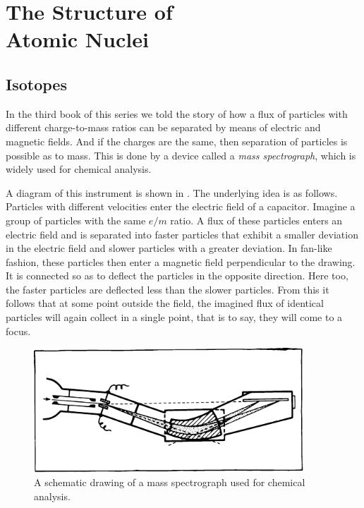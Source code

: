 

\cleardoublepage
\chapter[The Structure of Atomic Nuclei]{The Structure of \\Atomic Nuclei}
\label{ch-05}

\section{Isotopes}
In the third book of this series we told the story of how a flux of particles with different charge-to-mass ratios can be separated by means of electric and magnetic fields. And if the charges are the same, then separation of particles is possible as to mass. This is done by a device called a \emph{mass spectrograph}, which is widely used for chemical analysis.


A diagram of this instrument is shown in . The underlying idea is as follows. Particles with different velocities enter the electric field of a capacitor. Imagine a group of particles with the same $e/m$ ratio. A flux of these particles enters an electric field and is separated into faster particles that exhibit a smaller deviation in the electric field and slower particles with a greater
deviation. In fan-like fashion, these particles then enter a magnetic field perpendicular to the drawing. It is con­nected so as to deflect the particles in the opposite di­rection. Here too, the faster particles are deflected less than the slower particles. From this it follows that at some point outside the field, the imagined flux of identical particles will again collect in a single point, that is to
say, they will come to a focus.

\begin{figure}[!ht]
\centering
\includegraphics[width=0.9\textwidth]{figures/fig-05-01.pdf}
\caption{A schematic drawing of a mass spectrograph used for chemical analysis.}
\label{fig-5.1}
\end{figure}


